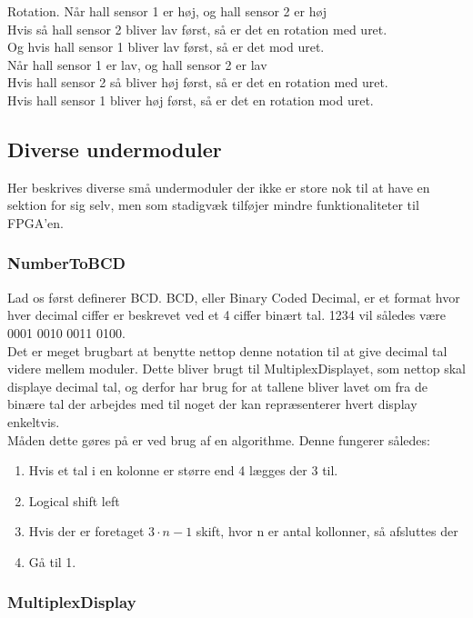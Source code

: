 Rotation.
Når hall sensor 1 er høj, og hall sensor 2 er høj\\
Hvis så hall sensor 2 bliver lav først, så er det en rotation med uret.\\
Og hvis hall sensor 1 bliver lav først, så er det mod uret.\\

Når hall sensor 1 er lav, og hall sensor 2 er lav\\
Hvis hall sensor 2 så bliver høj først, så er det en rotation med uret.\\
Hvis hall sensor 1 bliver høj først, så er det en rotation mod uret.\\

\subsection{Diverse undermoduler}
Her beskrives diverse små undermoduler der ikke er store nok til at have en sektion for sig selv, men som stadigvæk tilføjer mindre funktionaliteter til FPGA'en.

\subsubsection{NumberToBCD}

Lad os først definerer BCD. BCD, eller Binary Coded Decimal, er et format hvor hver decimal ciffer er beskrevet ved et 4 ciffer binært tal. 1234 vil således være 0001 0010 0011 0100.
\\
Det er meget brugbart at benytte nettop denne notation til at give decimal tal videre mellem moduler. Dette bliver brugt til MultiplexDisplayet, som nettop skal displaye decimal tal, og derfor har brug for at tallene bliver lavet om fra de binære tal der arbejdes med til noget der kan repræsenterer hvert display enkeltvis.
\\
Måden dette gøres på er ved brug af en algorithme. Denne fungerer således:

\begin{enumerate}
\item Hvis et tal i en kolonne er større end 4 lægges der 3 til.
\item Logical shift left
\item Hvis der er foretaget $3 \cdot n - 1$ skift, hvor n er antal kollonner, så afsluttes der
\item Gå til 1.
\end{enumerate}

\subsubsection{MultiplexDisplay}

